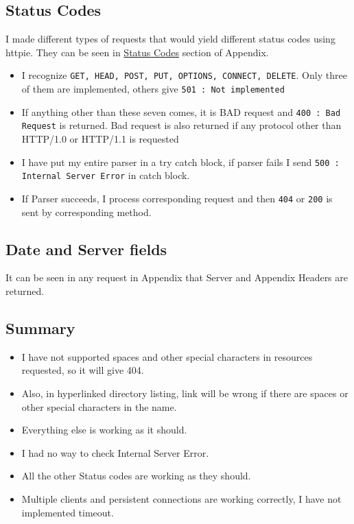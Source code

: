 \documentclass[11pt]{article}
\begin{document}
\subsection{Status Codes}
\label{sec:orgheadline23}
I made different types of requests that would yield different status codes using httpie. They can be seen in \hyperref[sec:orgheadline22]{Status Codes} section of Appendix.
\begin{itemize}
\item I recognize \texttt{GET, HEAD, POST, PUT, OPTIONS, CONNECT, DELETE}. Only three of them are implemented, others give \texttt{501 : Not implemented}
\item If anything other than these seven comes, it is BAD request and \texttt{400 : Bad Request} is returned. Bad request is also returned if any protocol other than HTTP/1.0 or HTTP/1.1 is requested
\item I have put my entire parser in a try catch block, if parser fails I send \texttt{500 : Internal Server Error} in catch block.
\item If Parser succeeds, I process corresponding request and then \texttt{404} or \texttt{200} is sent by corresponding method.
\end{itemize}
\subsection{Date and Server fields}
\label{sec:orgheadline24}
It can be seen in any request in Appendix that Server and Appendix Headers are returned.
\subsection{Summary}
\label{sec:orgheadline25}
\begin{itemize}
\item I have not supported spaces and other special characters in resources requested, so it will give 404.
\item Also, in hyperlinked directory listing, link will be wrong if there are spaces or other special characters in the name.
\item Everything else is working as it should.
\item I had no way to check Internal Server Error.
\item All the other Status codes are working as they should.
\item Multiple clients and persistent connections are working correctly, I have not implemented timeout.
\end{itemize}
\newpage
\end{document}
